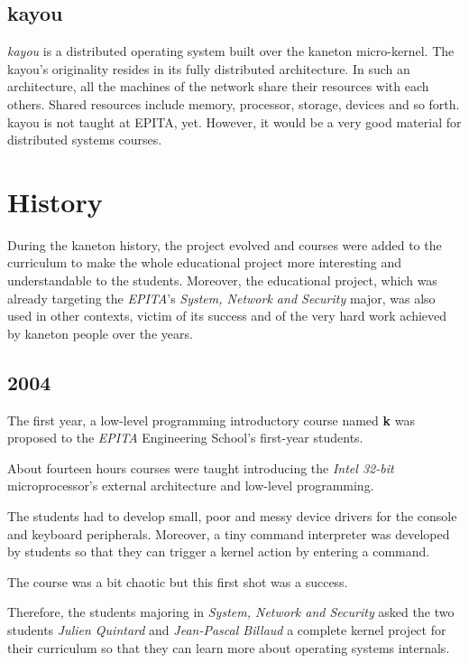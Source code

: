 \begin{multicols}{2}
\subsection{kayou}

\textit{kayou} is a distributed operating system built over the kaneton
micro-kernel. The kayou's originality resides in its fully distributed
architecture. In such an architecture, all the machines of the network share
their resources with each others. Shared resources include memory, processor,
storage, devices and so forth. kayou is not taught at EPITA, yet. However,
it would be a very good material for distributed systems courses.

%
%

\section{History}

During the kaneton history, the project evolved and courses were added
to the curriculum to make the whole educational project more interesting and
understandable to the students. Moreover, the educational project, which
was already targeting the \textit{EPITA}'s \textit{System, Network and
Security} major, was also used in other contexts, victim of its success
and of the very hard work achieved by kaneton people over the years.

%
%

\subsection{2004}

The first year, a low-level programming introductory course named \textbf{k}
was proposed to the \textit{EPITA} Engineering School's first-year students.

About fourteen hours courses were taught introducing the \textit{Intel 32-bit}
microprocessor's external architecture and low-level programming.

The students had to develop small, poor and messy device drivers for the
console and keyboard peripherals. Moreover, a tiny command interpreter was
developed by students so that they can trigger a kernel action by entering
a command.

The course was a bit chaotic but this first shot was a success.

Therefore, the students majoring in \textit{System, Network and Security}
asked the two students \textit{Julien Quintard} and \textit{Jean-Pascal
Billaud} a complete kernel project for their curriculum so that they can
learn more about operating systems internals.


\end{multicols}

